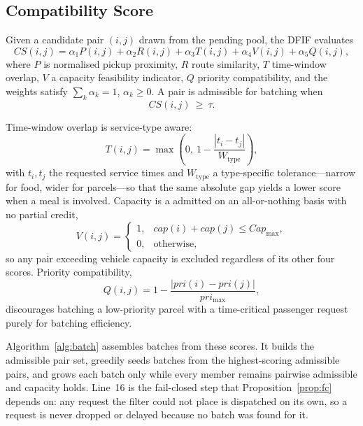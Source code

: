 \documentclass[conference]{IEEEtran}
\begin{document}
\subsection{Compatibility Score}
Given a candidate pair $(i,j)$ drawn from the pending pool, the DFIF
evaluates
\begin{equation}
CS(i,j)=\alpha_1 P(i,j)+\alpha_2 R(i,j)+\alpha_3 T(i,j)
        +\alpha_4 V(i,j)+\alpha_5 Q(i,j),
\end{equation}
where $P$ is normalised pickup proximity, $R$ route similarity, $T$
time-window overlap, $V$ a capacity feasibility indicator, $Q$ priority
compatibility, and the weights satisfy $\sum_k \alpha_k = 1$, $\alpha_k\ge0$.
A pair is admissible for batching when
\begin{equation}
CS(i,j)\ \ge\ \tau .
\end{equation}

Time-window overlap is service-type aware:
\begin{equation}
T(i,j)=\max\!\left(0,\ 1-\frac{|t_i-t_j|}{W_{\text{type}}}\right),
\end{equation}
with $t_i,t_j$ the requested service times and $W_{\text{type}}$ a
type-specific tolerance---narrow for food, wider for parcels---so that the
same absolute gap yields a lower score when a meal is involved. Capacity is a
admitted on an all-or-nothing basis with no partial credit,
\begin{equation}
V(i,j)=\begin{cases}
1, & cap(i)+cap(j)\le Cap_{\max},\\
0, & \text{otherwise},
\end{cases}
\end{equation}
so any pair exceeding vehicle capacity is excluded regardless of its other
four scores. Priority compatibility,
\begin{equation}
Q(i,j)=1-\frac{|pri(i)-pri(j)|}{pri_{\max}},
\end{equation}
discourages batching a low-priority parcel with a time-critical passenger
request purely for batching efficiency.

Algorithm~\ref{alg:batch} assembles batches from these scores. It builds the
admissible pair set, greedily seeds batches from the highest-scoring
admissible pairs, and grows each batch only while every member remains
pairwise admissible and capacity holds. Line~16 is the fail-closed step that
Proposition~\ref{prop:fc} depends on: any request the filter could not place
is dispatched on its own, so a request is never dropped or delayed because no
batch was found for it.
\end{document}
